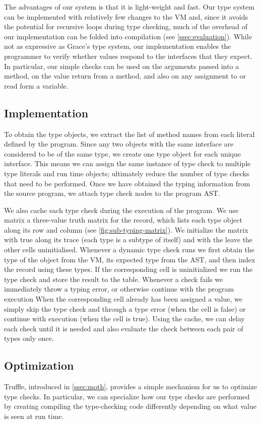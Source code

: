 The advantages of our system is that it is light-weight and fast. 
Our type system can be implemented with relatively few changes to the VM and,
since it avoids the potential for recursive loops during type checking,
much of the overhead of our implementation can be folded into compilation (see \cref{ssec:evaluation}).
While not as expressive as Grace's type system, our implementation enables
the programmer to verify whether values respond to the interfaces that they expect. 
In particular,
our simple checks can be used on the arguments passed into a method,
on the value return from a method, and also
on any assignment to or read form a variable.

\subsection{Implementation}

To obtain the type objects,
we extract the list of method names from each literal defined by the program.
Since any two objects with the same interface are considered to be of the same type,
we create one type object for each unique interface. 
This means we can assign the same instance of type check to multiple type literals
and run time objects;
ultimately reduce the number of type checks that need to be performed.
Once we have obtained the typing information from the source program,
we attach type check nodes to the program AST.

We also cache each type check during the execution of the program.
We use matrix a three-value truth matrix for the record, 
which lists each type object along its row and column (see \cref{fig:sub-typing-matrix}).
We initialize the matrix with true along its trace (each type is a subtype of itself) and 
with the leave the other cells uninitialised.
Whenever a dynamic type check runs we first obtain the type of the object from the VM, 
its expected type from the AST,
and then index the record using these types.
If the corresponding cell is uninitialized
we run the type check and store the result to the table.
Whenever a check fails we immediately throw a typing error, or otherwise
continue with the program execution 
When the corresponding cell already has been assigned a value,
we simply skip the type check and through a type error (when the cell is false)
or continue with execution (when the cell is true).
Using the cache, we can delay each check until it is needed and 
also evaluate the check between each pair of types only once.


\subsection{Optimization}

Truffle, introduced in \cref{ssec:moth}, provides a simple mechanism for us to optimize type checks.
In particular,
we can specialize how our type checks are performed by creating compiling the type-checking code
differently depending on what value is seen at run time.
